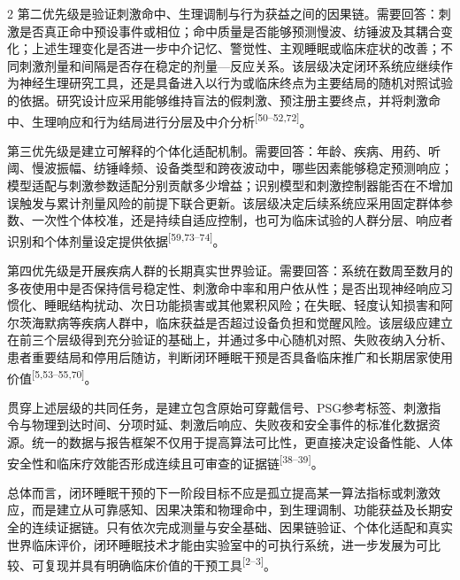 \documentclass[UTF8,zihao=5,fontset=none]{ctexart}
\newcommand{\hei}{\CJKfamily{hei}}
\newcommand{\leveltwo}[1]{%
  \par\noindent{\hei\fontsize{10.5pt}{12.6pt}\selectfont\mdseries #1\par}}
\newcommand{\refcite}[1]{\nolinebreak[4]\textsuperscript{[#1]}}
\begin{document}
\begin{multicols}{2}
第二优先级是验证刺激命中、生理调制与行为获益之间的因果链。需要回答：刺激是否真正命中预设事件或相位；命中质量是否能够预测慢波、纺锤波及其耦合变化；上述生理变化是否进一步中介记忆、警觉性、主观睡眠或临床症状的改善；不同刺激剂量和间隔是否存在稳定的剂量—反应关系。该层级决定闭环系统应继续作为神经生理研究工具，还是具备进入以行为或临床终点为主要结局的随机对照试验的依据。研究设计应采用能够维持盲法的假刺激、预注册主要终点，并将刺激命中、生理响应和行为结局进行分层及中介分析\refcite{50--52,72}。\par

第三优先级是建立可解释的个体化适配机制。需要回答：年龄、疾病、用药、听阈、慢波振幅、纺锤峰频、设备类型和跨夜波动中，哪些因素能够稳定预测响应；模型适配与刺激参数适配分别贡献多少增益；识别模型和刺激控制器能否在不增加误触发与累计剂量风险的前提下联合更新。该层级决定后续系统应采用固定群体参数、一次性个体校准，还是持续自适应控制，也可为临床试验的人群分层、响应者识别和个体剂量设定提供依据\refcite{59,73--74}。\par

第四优先级是开展疾病人群的长期真实世界验证。需要回答：系统在数周至数月的多夜使用中是否保持信号稳定性、刺激命中率和用户依从性；是否出现神经响应习惯化、睡眠结构扰动、次日功能损害或其他累积风险；在失眠、轻度认知损害和阿尔茨海默病等疾病人群中，临床获益是否超过设备负担和觉醒风险。该层级应建立在前三个层级得到充分验证的基础上，并通过多中心随机对照、失败夜纳入分析、患者重要结局和停用后随访，判断闭环睡眠干预是否具备临床推广和长期居家使用价值\refcite{5,53--55,70}。\par

贯穿上述层级的共同任务，是建立包含原始可穿戴信号、PSG参考标签、刺激指令与物理到达时间、分项时延、刺激后响应、失败夜和安全事件的标准化数据资源。统一的数据与报告框架不仅用于提高算法可比性，更直接决定设备性能、人体安全性和临床疗效能否形成连续且可审查的证据链\refcite{38--39}。\par

\leveltwo{7.3 总结}

总体而言，闭环睡眠干预的下一阶段目标不应是孤立提高某一算法指标或刺激效应，而是建立从可靠感知、因果决策和物理命中，到生理调制、功能获益及长期安全的连续证据链。只有依次完成测量与安全基础、因果链验证、个体化适配和真实世界临床评价，闭环睡眠技术才能由实验室中的可执行系统，进一步发展为可比较、可复现并具有明确临床价值的干预工具\refcite{2--3}。\par



\end{multicols}
\end{document}
